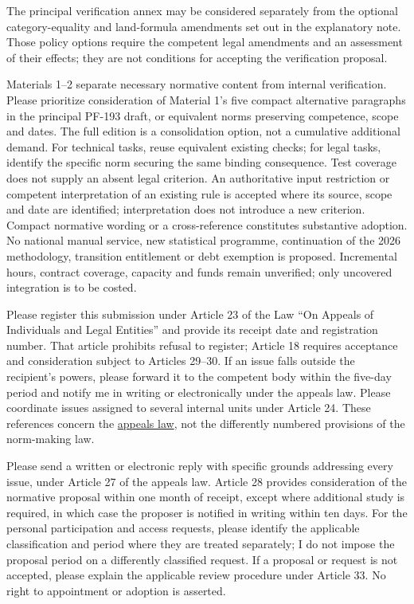 \documentclass[14pt,a4paper]{extarticle}
\begin{document}
The principal verification annex may be considered separately from the optional category-equality and land-formula amendments set out in the explanatory note. Those policy options require the competent legal amendments and an assessment of their effects; they are not conditions for accepting the verification proposal.

Materials 1–2 separate necessary normative content from internal verification. Please prioritize consideration of Material 1's five compact alternative paragraphs in the principal PF-193 draft, or equivalent norms preserving competence, scope and dates. The full edition is a consolidation option, not a cumulative additional demand. For technical tasks, reuse equivalent existing checks; for legal tasks, identify the specific norm securing the same binding consequence. Test coverage does not supply an absent legal criterion. An authoritative input restriction or competent interpretation of an existing rule is accepted where its source, scope and date are identified; interpretation does not introduce a new criterion. Compact normative wording or a cross-reference constitutes substantive adoption. No national manual service, new statistical programme, continuation of the 2026 methodology, transition entitlement or debt exemption is proposed. Incremental hours, contract coverage, capacity and funds remain unverified; only uncovered integration is to be costed.

Please register this submission under Article 23 of the Law “On Appeals of Individuals and Legal Entities” and provide its receipt date and registration number. That article prohibits refusal to register; Article 18 requires acceptance and consideration subject to Articles 29–30. If an issue falls outside the recipient’s powers, please forward it to the competent body within the five-day period and notify me in writing or electronically under the appeals law. Please coordinate issues assigned to several internal units under Article 24. These references concern the \href{https://lex.uz/docs/-3336169}{appeals law}, not the differently numbered provisions of the norm-making law.

Please send a written or electronic reply with specific grounds addressing every issue, under Article 27 of the appeals law. Article 28 provides consideration of the normative proposal within one month of receipt, except where additional study is required, in which case the proposer is notified in writing within ten days. For the personal participation and access requests, please identify the applicable classification and period where they are treated separately; I do not impose the proposal period on a differently classified request. If a proposal or request is not accepted, please explain the applicable review procedure under Article 33. No right to appointment or adoption is asserted.
\end{document}
